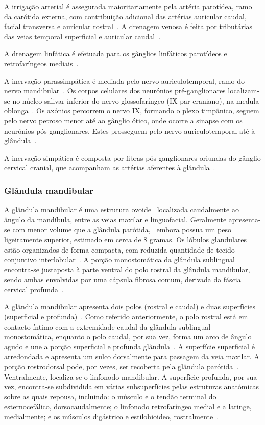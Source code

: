 A irrigação arterial é assegurada maioritariamente pela artéria parotídea, ramo da carótida externa, com contribuição adicional das artérias auricular caudal, facial transversa e auricular rostral~\cite{Singh2017}. A drenagem venosa é feita por tributárias das veias temporal superficial e auricular caudal~\cite{Singh2017}.


A drenagem linfática é efetuada para os gânglios linfáticos parotídeos e retrofaríngeos mediais~\cite{Singh2017}.


A inervação parassimpática é mediada pelo nervo auriculotemporal, ramo do nervo mandibular~\cite{Singh2017}. Os corpos celulares dos neurónios pré-ganglionares localizam-se no núcleo salivar inferior do nervo glossofaríngeo (IX par craniano), na medula oblonga~\cite{Singh2017}. Os axónios percorrem o nervo IX, formando o plexo timpânico, seguem pelo nervo petroso menor até ao gânglio ótico, onde ocorre a sinapse com os neurónios pós-ganglionares. Estes prosseguem pelo nervo auriculotemporal até à glândula~\cite{Singh2017}.


A inervação simpática é composta por fibras pós-ganglionares oriundas do gânglio cervical cranial, que acompanham as artérias aferentes à glândula~\cite{Singh2017}.

\subsubsection{Glândula mandibular}

A glândula mandibular é uma estrutura ovoide ~\cite{evans_millers_2012,Singh2017}localizada caudalmente ao ângulo da mandíbula, entre as veias maxilar e linguofacial. Geralmente apresenta-se com menor volume que a glândula parótida,~\cite{Singh2017} embora possua um peso ligeiramente superior, estimado em cerca de 8 gramas. Os lóbulos glandulares estão organizados de forma compacta, com reduzida quantidade de tecido conjuntivo interlobular~\cite{Singh2017}. A porção monostomática da glândula sublingual encontra-se justaposta à parte ventral do polo rostral da glândula mandibular, sendo ambas envolvidas por uma cápsula fibrosa comum, derivada da fáscia cervical profunda~\cite{Singh2017}.


A glândula mandibular apresenta dois polos (rostral e caudal) e duas superfícies (superficial e profunda)~\cite{Singh2017}. Como referido anteriormente, o polo rostral está em contacto íntimo com a extremidade caudal da glândula sublingual monostomática, enquanto o polo caudal, por sua vez, forma um arco de ângulo agudo e une a porção superficial e profunda glândula~\cite{Singh2017}. A superfície superficial é arredondada e apresenta um sulco dorsalmente para passagem da veia maxilar. A porção rostrodorsal pode, por vezes, ser recoberta pela glândula parótida~\cite{Singh2017}. Ventralmente, localiza-se o linfonodo mandibular. A superfície profunda, por sua vez, encontra-se subdividida em várias subsuperfícies pelas estruturas anatómicas sobre as quais repousa, incluindo: o músculo e o tendão terminal do esternocefálico, dorsocaudalmente; o linfonodo retrofaríngeo medial e a laringe, medialmente; e os músculos digástrico e estilohioideo, rostralmente~\cite{Singh2017}.


